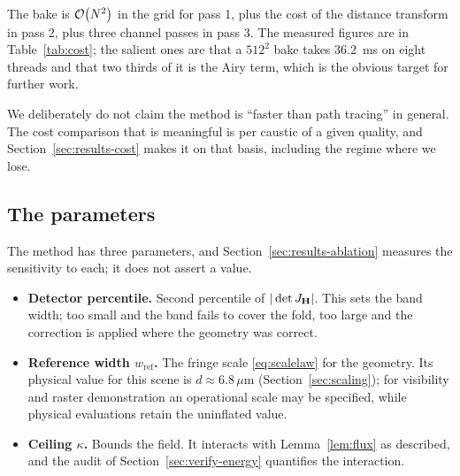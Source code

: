 The bake is $\mathcal{O}\!\left(N^2\right)$ in the grid for pass 1, plus the cost of the distance
transform in pass 2, plus three channel passes in pass 3. The measured figures
are in Table~\ref{tab:cost}; the salient ones are that a $512^2$ bake takes
\SI{36.2}{\milli\second} on eight threads and that two thirds of it is the Airy
term, which is the obvious target for further work.

We deliberately do not claim the method is ``faster than path tracing'' in
general. The cost comparison that is meaningful is per caustic of a given
quality, and Section~\ref{sec:results-cost} makes it on that basis, including
the regime where we lose.

\subsection{The parameters}
\label{sec:ours-parameters}

The method has three parameters, and Section~\ref{sec:results-ablation}
measures the sensitivity to each; it does not assert a value.

\begin{itemize}
\item \textbf{Detector percentile.} Second percentile of $|\det J_{\mathbf{H}}|$. This sets
      the band width; too small and the band fails to cover the fold, too large
      and the correction is applied where the geometry was correct.
\item \textbf{Reference width $w_{\text{ref}}$.} The fringe scale
      \eqref{eq:scalelaw} for the geometry. Its physical value for
      this scene is $d \approx 6.8\,\mu\text{m}$ (Section~\ref{sec:scaling});
      for visibility and raster demonstration an operational scale may be specified,
      while physical evaluations retain the uninflated value.
\item \textbf{Ceiling $\kappa$.} Bounds the field. It interacts with
      Lemma~\ref{lem:flux} as described, and the audit of
      Section~\ref{sec:verify-energy} quantifies the interaction.
\end{itemize}
